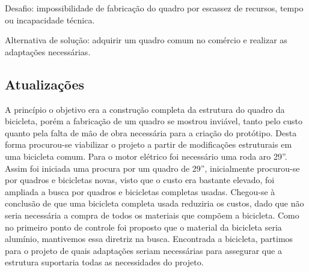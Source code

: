 	Desafio: impossibilidade de fabricação do quadro  por escassez de recursos, tempo ou incapacidade técnica.

	Alternativa de solução: adquirir um quadro comum no comércio e realizar as adaptações necessárias.

	\subsection{Atualizações}
	A princípio o objetivo era a construção completa da estrutura do quadro da bicicleta, porém a fabricação de um quadro se mostrou inviável, tanto pelo custo quanto pela falta de mão de obra necessária para a criação do protótipo. Desta forma procurou-se viabilizar o projeto a partir de modificações estruturais em uma bicicleta comum. 
	Para o motor elétrico foi necessário uma roda aro 29”. Assim foi iniciada uma procura por um quadro de 29”, inicialmente procurou-se por quadros e bicicletas novas, visto que o custo era bastante elevado, foi ampliada a busca por quadros e bicicletas completas usadas. Chegou-se à conclusão de que uma bicicleta completa usada reduziria os custos, dado que não seria necessária a compra de todos os materiais que compõem a bicicleta. 
	Como no primeiro ponto de controle foi proposto que o material da bicicleta seria alumínio, mantivemos essa diretriz na busca. Encontrada a bicicleta, partimos para o projeto de quais adaptações seriam necessárias para assegurar que a estrutura suportaria todas as necessidades do projeto.
	
